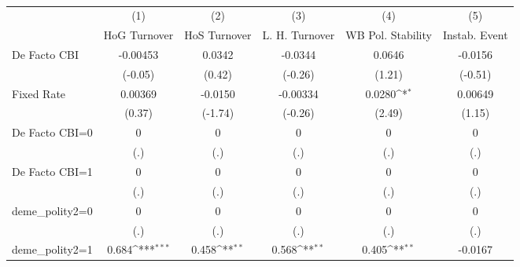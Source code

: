 \begin{table}[htbp]\centering
\def\sym#1{\ifmmode^{#1}\else\(^{#1}\)\fi}
\caption{\label{binarydemcmultIndFEDF}}
\begin{tabular}{l*{5}{c}}
\toprule
                                        &\multicolumn{1}{c}{(1)}&\multicolumn{1}{c}{(2)}&\multicolumn{1}{c}{(3)}&\multicolumn{1}{c}{(4)}&\multicolumn{1}{c}{(5)}\\
                                        &\multicolumn{1}{c}{HoG Turnover}&\multicolumn{1}{c}{HoS Turnover}&\multicolumn{1}{c}{L. H. Turnover}&\multicolumn{1}{c}{WB Pol. Stability}&\multicolumn{1}{c}{Instab. Event}\\
\midrule
De Facto CBI                            & -0.00453         &   0.0342         &  -0.0344         &   0.0646         &  -0.0156         \\
                                        &  (-0.05)         &   (0.42)         &  (-0.26)         &   (1.21)         &  (-0.51)         \\
\addlinespace
Fixed Rate                              &  0.00369         &  -0.0150         & -0.00334         &   0.0280\sym{*}  &  0.00649         \\
                                        &   (0.37)         &  (-1.74)         &  (-0.26)         &   (2.49)         &   (1.15)         \\
\addlinespace
De Facto CBI=0                          &        0         &        0         &        0         &        0         &        0         \\
                                        &      (.)         &      (.)         &      (.)         &      (.)         &      (.)         \\
\addlinespace
De Facto CBI=1                          &        0         &        0         &        0         &        0         &        0         \\
                                        &      (.)         &      (.)         &      (.)         &      (.)         &      (.)         \\
\addlinespace
deme\_polity2=0                          &        0         &        0         &        0         &        0         &        0         \\
                                        &      (.)         &      (.)         &      (.)         &      (.)         &      (.)         \\
\addlinespace
deme\_polity2=1                          &    0.684\sym{***}&    0.458\sym{**} &    0.568\sym{**} &    0.405\sym{**} &  -0.0167         \\

\end{tabular}
\end{table}
